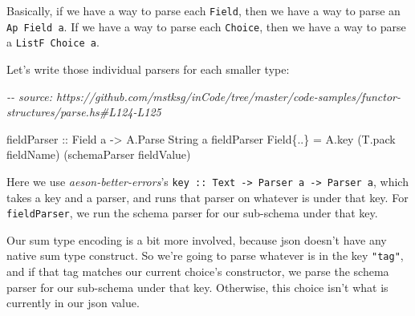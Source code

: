 \documentclass[]{article}
\newenvironment{Shaded}{}{}
\newcommand{\CommentTok}[1]{\textcolor[rgb]{0.38,0.63,0.69}{\textit{#1}}}
\newcommand{\DataTypeTok}[1]{\textcolor[rgb]{0.56,0.13,0.00}{#1}}
\newcommand{\KeywordTok}[1]{\textcolor[rgb]{0.00,0.44,0.13}{\textbf{#1}}}
\newcommand{\NormalTok}[1]{#1}
\newcommand{\OperatorTok}[1]{\textcolor[rgb]{0.40,0.40,0.40}{#1}}
\newcommand{\OtherTok}[1]{\textcolor[rgb]{0.00,0.44,0.13}{#1}}
\newcommand{\StringTok}[1]{\textcolor[rgb]{0.25,0.44,0.63}{#1}}
\begin{document}
Basically, if we have a way to parse each \texttt{Field}, then we have a way to
parse an \texttt{Ap\ Field\ a}. If we have a way to parse each \texttt{Choice},
then we have a way to parse a \texttt{ListF\ Choice\ a}.

Let's write those individual parsers for each smaller type:

\begin{Shaded}
\begin{Highlighting}[]
\CommentTok{{-}{-} source: https://github.com/mstksg/inCode/tree/master/code{-}samples/functor{-}structures/parse.hs\#L124{-}L125}

\OtherTok{fieldParser ::} \DataTypeTok{Field}\NormalTok{ a }\OtherTok{{-}>} \DataTypeTok{A.Parse} \DataTypeTok{String}\NormalTok{ a}
\NormalTok{fieldParser }\DataTypeTok{Field}\NormalTok{\{}\OperatorTok{..}\NormalTok{\} }\OtherTok{=}\NormalTok{ A.key (T.pack fieldName) (schemaParser fieldValue)}
\end{Highlighting}
\end{Shaded}

Here we use \emph{aeson-better-errors}'s
\texttt{key\ ::\ Text\ -\textgreater{}\ Parser\ a\ -\textgreater{}\ Parser\ a},
which takes a key and a parser, and runs that parser on whatever is under that
key. For \texttt{fieldParser}, we run the schema parser for our sub-schema under
that key.

\begin{Shaded}
\end{Shaded}

Our sum type encoding is a bit more involved, because json doesn't have any
native sum type construct. So we're going to parse whatever is in the key
\texttt{"tag"}, and if that tag matches our current choice's constructor, we
parse the schema parser for our sub-schema under that key. Otherwise, this
choice isn't what is currently in our json value.
\end{document}
